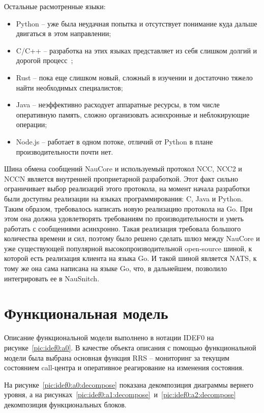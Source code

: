 Остальные расмотренные языки:
\begin{itemize}
    \item Python -- уже была неудачная попытка и отсутствует понимание куда дальше двигаться в этом направлении;
    \item C/C++ -- разработка на этих языках представляет из себя слишком долгий и дорогой процесс~\cite{Goinyandex};
    \item Rust -- пока еще слишком новый, сложный в изучении и достаточно тяжело найти необходимых специалистов;
    \item Java -- неэффективно расходует аппаратные ресурсы, в том числе оперативную память,
    сложно организовать асинхронные и неблокирующие операции;
    \item Node.js -- работает в одном потоке, отличий от Python в плане производительности почти нет.
\end{itemize}

Шина обмена сообщений NauCore и используемый протокол NCC, NCC2 и NCCN является
внутренней проприетарной разработкой.
Этот факт сильно ограничивает выбор реализаций этого протокола,
на момент начала разработки были доступны реализации на языках программирования: C, Java и Python.
Таким образом, требовалось написать новую реализацию протокола на Go.
При этом она должна удовлетворять требованиям по производительности
и уметь работать с сообщениями асинхронно.
Такая реализация требовала большого количества времени и сил,
поэтому было решено сделать шлюз между NauCore и
уже существующей популярной высокопроизводительной open-source шиной,
к которой есть реализация клиента на языка Go.
И такой шиной является NATS, к тому же она сама написана на языке Go,
что, в дальнейшем, позволило интегрировать ее в NauSnitch.

\section{Функциональная модель}

Описание функциональной модели выполнено в нотации IDEF0 на рисунке~\ref{pic:idef0:a0}.
В качестве объекта описания с помощью функциональной модели была выбрана основная функция RRS --
мониторинг за текущим состоянием call-центра и оперативное реагирование на изменения состояния.

На рисунке~\ref{pic:idef0:a0:decompose} показана декомпозиция диаграммы вернего уровня,
а на рисунках~\ref{pic:idef0:a1:decompose}~и~\ref{pic:idef0:a2:decompose} декомпозиция функциональных блоков.


